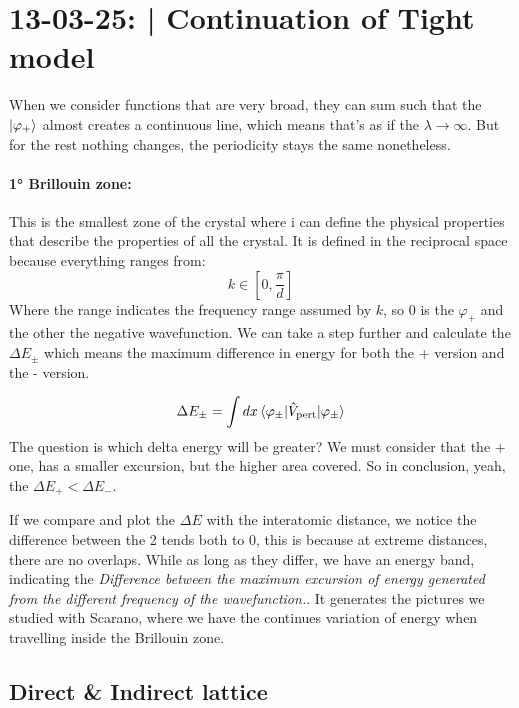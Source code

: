 \section{13-03-25: | Continuation of Tight model}

When we consider functions that are very broad, they can sum such that the $\ket{\varphi_+}$ almost creates a continuous line, which means that's as if the $\lambda \rightarrow \infty$. But for the rest nothing changes, the periodicity stays the same nonetheless.

\paragraph{1° Brillouin zone:} This is the smallest zone of the crystal where i can define the physical properties that describe the properties of all the crystal. It is defined in the reciprocal space because everything ranges from:
\begin{equation}
    k \in \left[0, \frac{\pi}{d}\right]
\end{equation}
Where the range indicates the frequency range assumed by $k$, so 0 is the $\varphi_+$ and the other the negative wavefunction.
We can take a step further and calculate the $\Delta E_{\pm}$ which means the maximum difference in energy for both the + version and the - version.

\begin{equation}
    \Delta E_{\pm} = \int dx \braket{\varphi_{\pm}|\hat{V}_{\text{pert}}|\varphi_{\pm}}
\end{equation}
The question is which delta energy will be greater? We must consider that the + one, has a smaller excursion, but the higher area covered. So in conclusion, yeah, the $\Delta E_+ < \Delta E_-$. 

If we compare and plot the $\Delta E$ with the interatomic distance, we notice the difference between the 2 tends both to 0, this is because at extreme distances, there are no overlaps. While as long as they differ, we have an energy band, indicating the \textit{Difference between the maximum excursion of energy generated from the different frequency of the wavefunction.}. It generates the pictures we studied with Scarano, where we have the continues variation of energy when travelling inside the Brillouin zone.

\subsection{Direct \& Indirect lattice}

